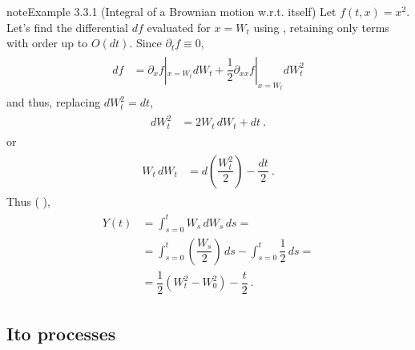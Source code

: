 \documentclass[letterpaper,10pt,english]{jupyterBook}
\begin{document}
\begin{sphinxadmonition}{note}{Example 3.3.1 (Integral of a Brownian motion w.r.t. itself)}
\sphinxAtStartPar
Let \(f(t,x) = x^2\). Let’s find the differential \(df\) evaluated for \(x = W_t\) using {\hyperref[\detokenize{ch/prob/processes-calculus:prob-processes-calculus-ito-lemma}]{}}, retaining only terms with order up to \(O(dt)\). Since \(\partial_t f \equiv 0\),
\begin{equation*}
\begin{split}\begin{aligned}
  df & = \partial_x f|_{x=W_t} dW_t + \dfrac{1}{2} \partial_{xx} f|_{x=W_t} dW_t^2 
\end{aligned}\end{split}
\end{equation*}
\sphinxAtStartPar
and thus, replacing \(dW_t^2 = dt\),
\begin{equation*}
\begin{split}\begin{aligned}
  d W_t^2 & =  2 W_t \, dW_t + dt \ .
\end{aligned}\end{split}
\end{equation*}
\sphinxAtStartPar
or
\begin{equation*}
\begin{split}\begin{aligned}
  W_t \, d W_t & = d \left( \dfrac{W_t^2}{2} \right) - \dfrac{dt}{2} \ .
\end{aligned}\end{split}
\end{equation*}
\sphinxAtStartPar
Thus ( ),
\begin{equation*}
\begin{split}\begin{aligned}
  Y(t)
  & = \int_{s=0}^t W_s \, dW_s \, ds = \\
  & = \int_{s=0}^t \left( \dfrac{W_s}{2} \right) \, ds - \int_{s=0}^t \dfrac{1}{2} \, ds = \\
  & = \dfrac{1}{2} \left( W_t^2 - W_0^2 \right) - \dfrac{t}{2} \ .
\end{aligned}\end{split}
\end{equation*}\end{sphinxadmonition}


\subsection{Ito processes}
\label{\detokenize{ch/prob/processes-calculus:ito-processes}}\label{\detokenize{ch/prob/processes-calculus:prob-processes-calculus-ito-process}}
\end{document}

